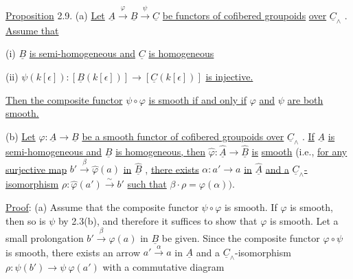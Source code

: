 \underline{Proposition} 2.9.  (a)  \underline{Let}  $\underline{A} \xrightarrow{\ \varphi\ } \underline{B} \xrightarrow{\ \psi\ } \underline{C}$  \underline{be functors of cofibered groupoids} \underline{over}  $\underline{C}_{\wedge}$  . \underline{Assume that}

(i)  $\underline{B}$  \underline{is semi-homogeneous and}  $\underline{C}$  \underline{is homogeneous}

(ii)  $\psi(k[\epsilon]) : [\underline{B}(k[\epsilon])] \longrightarrow [\underline{C}(k[\epsilon])]$  \underline{is injective.}

\underline{Then the composite functor}  $\psi \circ \varphi$  \underline{is smooth if and only if}  $\varphi$  \underline{and}  $\psi$  \underline{are both}
\underline{smooth.}

(b)  \underline{Let} $\varphi : \underline{A} \longrightarrow \underline{B}$ \underline{be a smooth functor of cofibered groupoids over} $\underline{C}_{\wedge}$ . \underline{If} $\underline{A}$ \underline{is semi-homogeneous and} $\underline{B}$ \underline{is homogeneous, then} $\widehat{\varphi} : \widehat{\underline{A}} \to \widehat{\underline{B}}$ \underline{is} \underline{smooth} (i.e., \underline{for any surjective map} $b' \xrightarrow{\ \beta\ } \widehat{\varphi}(a)$ \underline{in} $\widehat{\underline{B}}$ , \underline{there exists} $\alpha : a' \to a$ \underline{in} $\widehat{\underline{A}}$ \underline{and a} $\underline{C}_{\wedge}$\underline{-isomorphism} $\rho : \widehat{\varphi}(a') \xrightarrow{\ \sim\ } b'$ \underline{such that} $\beta \cdot \rho = \varphi(\alpha))$.

\underline{Proof}: (a)  Assume that the composite functor $\psi \circ \varphi$ is smooth. If $\varphi$ is smooth, then so is $\psi$ by 2.3(b), and therefore it suffices to show that $\varphi$ is smooth. Let a small prolongation $b' \xrightarrow{\ \beta\ } \varphi(a)$ in $\underline{B}$ be given. Since the composite functor $\varphi \circ \psi$ is smooth, there exists an arrow $a' \xrightarrow{\ \alpha\ } a$ in $\underline{A}$ and a $\underline{C}_{\wedge}$-isomorphism $\rho : \psi(b') \longrightarrow \psi\ \varphi(a')$ with a commutative diagram


